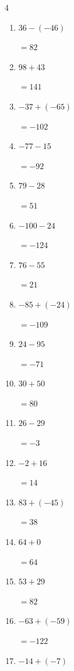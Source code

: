 \begin{multicols}{4}
\begin{enumerate}
  \item $36-(-46)$

        $=82$

  \item $98+43$

        $=141$

  \item $-37+(-65)$

        $=-102$

  \item $-77-15$

        $=-92$

  \item $79-28$

        $=51$

  \item $-100-24$

        $=-124$

  \item $76-55$

        $=21$

  \item $-85+(-24)$

        $=-109$

  \item $24-95$

        $=-71$

  \item $30+50$

        $=80$

  \item $26-29$

        $=-3$

  \item $-2+16$

        $=14$

  \item $83+(-45)$

        $=38$

  \item $64+0$

        $=64$

\columnbreak %

  \item $53+29$

        $=82$

  \item $-63+(-59)$

        $=-122$

  \item $-14+(-7)$


\end{enumerate}
\end{multicols}
